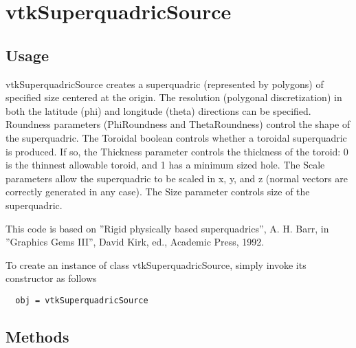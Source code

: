 \section{vtkSuperquadricSource}

\subsection{Usage}

 vtkSuperquadricSource creates a superquadric (represented by polygons) 
 of specified
 size centered at the origin. The resolution (polygonal discretization)
 in both the latitude (phi) and longitude (theta) directions can be
 specified. Roundness parameters (PhiRoundness and ThetaRoundness) control
 the shape of the superquadric.  The Toroidal boolean controls whether
 a toroidal superquadric is produced.  If so, the Thickness parameter
 controls the thickness of the toroid:  0 is the thinnest allowable
 toroid, and 1 has a minimum sized hole.  The Scale parameters allow 
 the superquadric to be scaled in x, y, and z (normal vectors are correctly
 generated in any case).  The Size parameter controls size of the 
 superquadric.

 This code is based on ''Rigid physically based superquadrics'', A. H. Barr,
 in ''Graphics Gems III'', David Kirk, ed., Academic Press, 1992.


To create an instance of class vtkSuperquadricSource, simply
invoke its constructor as follows
\begin{verbatim}
  obj = vtkSuperquadricSource
\end{verbatim}
\subsection{Methods}


